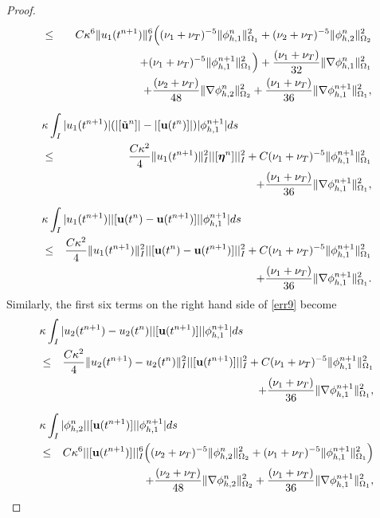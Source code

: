 \documentclass[10pt]{article}%
\numberwithin{equation}{section}
\begin{document}
\begin{proof}
\begin{eqnarray}
	&\leq&C\kappa^{6}\|u_1(t^{n+1})\|^{6}_I\Big({{ (\nu_1+\nu_T)^{-5}}}\|\phi_{h,1}^n\|^2_{\Omega_1}+{ (\nu_2+\nu_T)^{-5}}\|\phi_{h,2}^n\|^2_{\Omega_2}\nonumber\allowdisplaybreaks\\&&+{ (\nu_1+\nu_T)^{-5}}\|\phi_{h,1}^{n+1}\|^2_{\Omega_1}\Big)+\frac{{ (\nu_1+\nu_T)}}{32}\|\nabla \phi_{h,1}^n\|^2_{\Omega_1}\nonumber\\&&+\frac{{ (\nu_2+\nu_T)}}{48}\|\nabla \phi_{h,2}^n\|^2_{\Omega_2}+\frac{{ (\nu_1+\nu_T)}}{36}\|\nabla \phi_{h,1}^{n+1}\|^2_{\Omega_1},\label{err12}\allowdisplaybreaks\\[7pt]
\lefteqn{	\kappa \int_{I}|u_1(t^{n+1})|(|[\tilde{\bf u}^n]|-|[{\bf u}(t^n)]|)|\phi_{h,1}^{n+1}|ds}\nonumber\\&\leq&\frac{C\kappa^2}{4}\|u_1(t^{n+1})\|_I^2||[{\boldsymbol{\eta}}^n]||^2_I+C{{ (\nu_1+\nu_T)^{-5}}}\|\phi_{h,1}^{n+1}\|_{\Omega_1}^2\nonumber\\&&+\frac{{ (\nu_1+\nu_T)}}{36}\|\nabla \phi_{h,1}^{n+1}\|_{\Omega_1}^2,\label{err13}\allowdisplaybreaks\\[7pt]
\lefteqn{	\kappa \int_{I}|u_1(t^{n+1})||[{\bf u}(t^n)-{\bf u}(t^{n+1})]||\phi_{h,1}^{n+1}|ds}\nonumber\\&\leq&\frac{C\kappa^2}{4}\|u_1(t^{n+1})\|_I^2||[{\bf u}(t^n)-{\bf u}(t^{n+1})]||^2_I+C{{ (\nu_1+\nu_T)^{-5}}}\|\phi_{h,1}^{n+1}\|_{\Omega_1}^2\nonumber\\&&+\frac{{ (\nu_1+\nu_T)}}{36}\|\nabla \phi_{h,1}^{n+1}\|_{\Omega_1}^2 \label{err14}.
	\end{eqnarray}
	Similarly, the first six terms on the right hand side of \eqref{err9} become
	\begin{eqnarray}
	\lefteqn{\kappa \int_{I}|u_{2}(t^{n+1})-u_{2}(t^{n})||[{\bf u}(t^{n+1})]||\phi_{h,1}^{n+1}|ds}\nonumber\\&\leq&\frac{C\kappa^2}{4}\|u_{2}(t^{n+1})-u_{2}(t^{n})\|_I^2||[{\bf u}(t^{n+1})]||^2_I+C{{ (\nu_1+\nu_T)^{-5}}}\|\phi_{h,1}^{n+1}\|_{\Omega_1}^2\nonumber\\&&+\frac{{ (\nu_1+\nu_T)}}{36}\|\nabla \phi_{h,1}^{n+1}\|_{\Omega_1}^2\label{err15},\allowdisplaybreaks\\[7pt]
	\lefteqn{\kappa \int_{I}|\phi_{h,2}^{n}||[{\bf u}(t^{n+1})]||\phi_{h,1}^{n+1}|ds}\nonumber\\&\leq& C\kappa^{6}||[{\bf u}(t^{n+1})]||_I^{6}\Big({{ (\nu_2+\nu_T)^{-5}}}\|\phi_{h,2}^{n}\|^2_{\Omega_2}+{{ (\nu_1+\nu_T)^{-5}}}\|\phi_{h,1}^{n+1}\|^2_{\Omega_1}\Big)\nonumber\allowdisplaybreaks\\&&+\frac{{ (\nu_2+\nu_T)}}{48}\|\nabla \phi_{h,2}^{n}\|^2_{\Omega_2}+\frac{{ (\nu_1+\nu_T)}}{36}\|\nabla \phi_{h,1}^{n+1}\|^2_{\Omega_1},

\end{eqnarray}
\end{proof}
\end{document}

